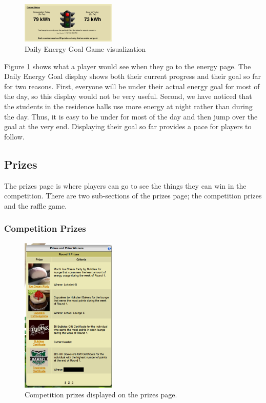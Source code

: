 \begin{figure}[t!]
  \center
  \includegraphics[width=0.4\textwidth]{images/daily-energy-goal-game.eps}
  \caption{Daily Energy Goal Game visualization}
  \label{fig:DailyEnergyGoal}
\end{figure}

Figure \ref{fig:DailyEnergyGoal} shows what a player would see when they go to the energy page. The Daily Energy Goal display shows both their current progress and their goal so far for two reasons. First, everyone will be under their actual energy goal for most of the day, so this display would not be very useful. Second, we have noticed that the students in the residence halls use more energy at night rather than during the day. Thus, it is easy to be under for most of the day and then jump over the goal at the very end. Displaying their goal so far provides a pace for players to follow.

\subsection{Prizes}
\label{makahiki:pages-prizes}

The prizes page is where players can go to see the things they can win in the competition. There are two sub-sections of the prizes page; the competition prizes and the raffle game.

\subsubsection{Competition Prizes}

\begin{figure}[h]
  \center
  \includegraphics[width=0.4\textwidth]{images/prizes-winners.eps}
  \caption{Competition prizes displayed on the prizes page.}
  \label{fig:prizes-winners}
\end{figure}

